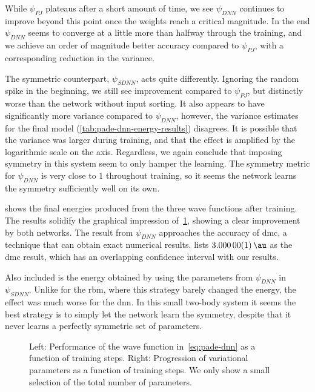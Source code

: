 \documentclass[Thesis.tex]{subfiles}
\begin{document}
While $\psi_{PJ}$ plateaus after a short amount of time, we see $\psi_{DNN}$
continues to improve beyond this point once the weights reach a critical
magnitude. In the end $\psi_{DNN}$ seems to converge at a little more than
halfway through the training, and we achieve an order of magnitude better
accuracy compared to $\psi_{PJ}$, with a corresponding reduction in the
variance.

The symmetric counterpart, $\psi_{SDNN}$, acts quite differently. Ignoring the
random spike in the beginning, we still see improvement compared to $\psi_{PJ}$,
but distinctly worse than the network without input sorting. It also appears to
have significantly more variance compared to $\psi_{DNN}$, however, the variance
estimates for the final model (\cref{tab:pade-dnn-energy-results}) disagrees. It
is possible that the variance was larger during training, and that the effect is
amplified by the logarithmic scale on the axis. Regardless, we again
conclude that imposing symmetry in this system seem to only hamper the learning.
The symmetry metric for $\psi_{DNN}$ is very close to $1$ throughout training,
so it seems the network learns the symmetry sufficiently well on its own.

 shows the final energies produced from the
three wave functions after training. The results solidify the graphical
impression of~\cref{fig:QD-pade-dnn-training}, showing a clear improvement by
both networks. The result from $\psi_{DNN}$ approaches the accuracy of \gls{dmc},
a technique that can obtain exact numerical results. \textcite{Pedersen-2011}
lists $\SI{3.00000(1)}{\au}$ as the \gls{dmc} result, which has an overlapping
confidence interval with our results.

Also included is the energy obtained by using the parameters from $\psi_{DNN}$
in $\psi_{SDNN}$. Unlike for the \gls{rbm}, where this strategy barely changed the
energy, the effect was much worse for the \gls{dnn}. In this small two-body
system it seems the best strategy is to simply let the network learn the
symmetry, despite that it never learns a perfectly symmetric set of parameters.

\begin{figure}[h]
   \centering
    \resizebox{\linewidth}{!}{%
        
    }
    \caption[Learning progression of a neural network on quantum dots]{\label{fig:QD-pade-dnn-training}Left: Performance of the wave
function in~\cref{eq:pade-dnn} as a function of training steps. Right:
Progression of variational parameters as a function of training steps. We only
show a small selection of the total number of parameters.}
\end{figure}
\end{document}
